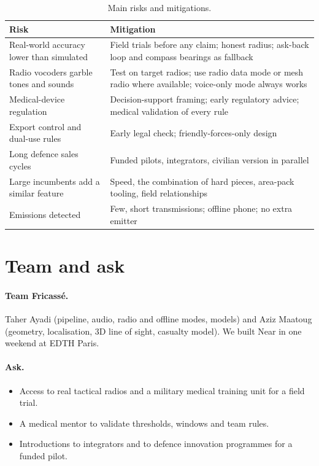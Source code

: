 \begin{table}[htbp]\centering\small
\caption{Main risks and mitigations.}\label{tab:risks}
\begin{tabularx}{\linewidth}{>{\raggedright}p{4cm}X}
\toprule
Risk & Mitigation\\
\midrule
Real-world accuracy lower than simulated & Field trials before any claim; honest radius; ask-back loop and compass bearings as fallback\\
Radio vocoders garble tones and sounds & Test on target radios; use radio data mode or mesh radio where available; voice-only mode always works\\
Medical-device regulation & Decision-support framing; early regulatory advice; medical validation of every rule\\
Export control and dual-use rules & Early legal check; friendly-forces-only design\\
Long defence sales cycles & Funded pilots, integrators, civilian version in parallel\\
Large incumbents add a similar feature & Speed, the combination of hard pieces, area-pack tooling, field relationships\\
Emissions detected & Few, short transmissions; offline phone; no extra emitter\\
\bottomrule
\end{tabularx}
\end{table}

\section{Team and ask}

\paragraph{Team Fricassé.} Taher Ayadi (pipeline, audio, radio and offline modes, models) and Aziz Maatoug
(geometry, localisation, 3D line of sight, casualty model). We built Near in one weekend at EDTH Paris.

\paragraph{Ask.}
\begin{itemize}
  \item Access to real tactical radios and a military medical training unit for a field trial.
  \item A medical mentor to validate thresholds, windows and team rules.
  \item Introductions to integrators and to defence innovation programmes for a funded pilot.
\end{itemize}
